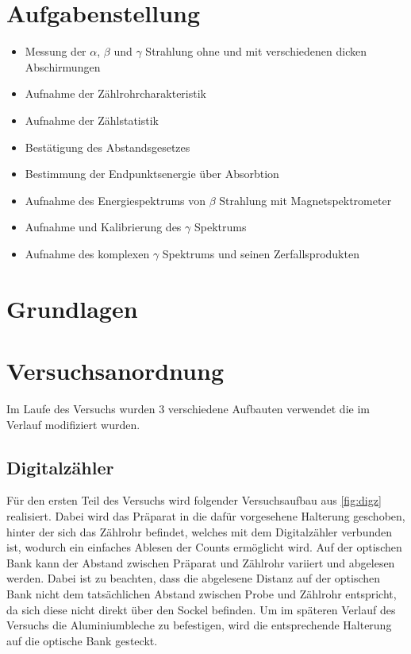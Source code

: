 \documentclass[12pt,english,ngerman]{scrartcl}
\begin{document}
%
\tableofcontents
\newpage

\section{Aufgabenstellung\label{Auf}}

\begin{itemize}
    \item Messung der $\alpha$, $\beta$ und $\gamma$ Strahlung ohne und mit verschiedenen dicken Abschirmungen
    \item Aufnahme der Zählrohrcharakteristik
    \item Aufnahme der Zählstatistik
    \item Bestätigung des Abstandsgesetzes
    \item Bestimmung der Endpunktsenergie über Absorbtion
    \item Aufnahme des Energiespektrums von $\beta$ Strahlung mit Magnetspektrometer
    \item Aufnahme und Kalibrierung des $\gamma$ Spektrums
    \item Aufnahme des komplexen $\gamma$ Spektrums und seinen Zerfallsprodukten
\end{itemize}

\section{Grundlagen}\label{Grund}


\section{Versuchsanordnung}\label{sec:Versuchsanordnung}

Im Laufe des Versuchs wurden 3 verschiedene Aufbauten verwendet die im Verlauf modifiziert wurden.

\subsection{Digitalzähler}\label{aufbau_Digz}

Für den ersten Teil des Versuchs wird folgender Versuchsaufbau aus \autoref{fig:digz} realisiert.
Dabei wird das Präparat in die dafür vorgesehene Halterung geschoben, hinter der sich das Zählrohr befindet, 
welches mit dem Digitalzähler verbunden ist, wodurch ein einfaches Ablesen der Counts ermöglicht wird.
Auf der optischen Bank kann der Abstand zwischen Präparat und Zählrohr variiert und abgelesen werden.
Dabei ist zu beachten, dass die abgelesene Distanz auf der optischen Bank nicht dem tatsächlichen Abstand zwischen 
Probe und Zählrohr entspricht, da sich diese nicht direkt über den Sockel befinden. Um im späteren Verlauf des Versuchs die 
Aluminiumbleche zu befestigen, wird die entsprechende Halterung auf die optische Bank gesteckt.
\end{document}
